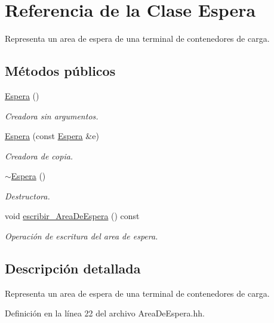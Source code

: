 \hypertarget{class_espera}{}\section{Referencia de la Clase Espera}
\label{class_espera}


Representa un area de espera de una terminal de contenedores de carga.  


\subsection*{Métodos públicos}
\begin{DoxyCompactItemize}
\item 
\hyperlink{class_espera_aeabb86dcbffd8c2b686fe330581ac82b}{Espera} ()
\begin{DoxyCompactList}\small\item\em Creadora sin argumentos. \end{DoxyCompactList}\item 
\hyperlink{class_espera_ad49a61099324e72417baa38ec365a475}{Espera} (const \hyperlink{class_espera}{Espera} \&e)
\begin{DoxyCompactList}\small\item\em Creadora de copia. \end{DoxyCompactList}\item 
\hyperlink{class_espera_a970b7c780ad48f158c408586d4b3b4b3}{$\sim$\+Espera} ()
\begin{DoxyCompactList}\small\item\em Destructora. \end{DoxyCompactList}\item 
void \hyperlink{class_espera_aacb008e5be8ecd85fbba9cdef8b8be33}{escribir\+\_\+\+Area\+De\+Espera} () const
\begin{DoxyCompactList}\small\item\em Operación de escritura del area de espera. \end{DoxyCompactList}\end{DoxyCompactItemize}


\subsection{Descripción detallada}
Representa un area de espera de una terminal de contenedores de carga. 

Definición en la línea 22 del archivo Area\+De\+Espera.\+hh.



